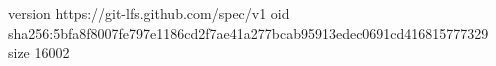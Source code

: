 version https://git-lfs.github.com/spec/v1
oid sha256:5bfa8f8007fe797e1186cd2f7ae41a277bcab95913edec0691cd416815777329
size 16002
